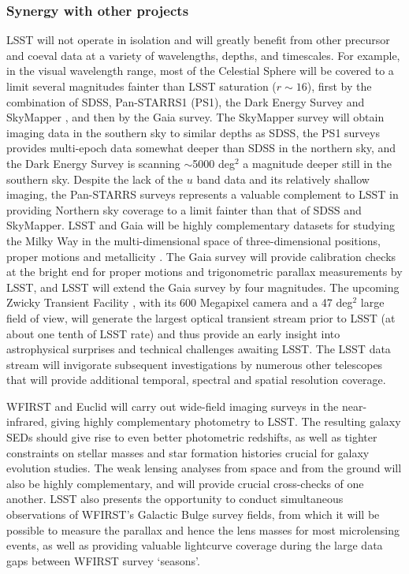 \subsubsection{  Synergy with other projects }

LSST will not operate in isolation and will greatly benefit from other precursor and coeval
data at a variety of wavelengths, depths, and timescales. For example,
in the visual wavelength range, most of the Celestial
Sphere will be covered to a limit several magnitudes fainter than LSST saturation
($r\sim16$), first by the combination of SDSS, Pan-STARRS1 (PS1), the
Dark Energy Survey \citep{2016MNRAS.460.1270D} and SkyMapper
\citep{2007PASA...24....1K},
and then by the Gaia survey. The SkyMapper survey will obtain imaging data in the southern
sky to similar depths as SDSS, the PS1 surveys provides multi-epoch
data somewhat deeper
than SDSS in the northern sky, and the Dark Energy Survey
 is scanning
$\sim$5000 deg$^2$ a magnitude deeper still in the southern sky. Despite the lack of
the $u$ band data and its relatively shallow imaging, the Pan-STARRS surveys
represents a valuable complement to LSST in providing Northern sky coverage to a limit
fainter than that of SDSS and SkyMapper. LSST and Gaia will
be highly complementary datasets for studying the Milky Way in the multi-dimensional space of
three-dimensional positions, proper motions and metallicity \citep{2012ARA&A..50..251I}.
The Gaia survey will provide calibration checks at the bright end for proper
motions and trigonometric parallax measurements by LSST, and LSST will extend the
Gaia survey by four magnitudes. The upcoming Zwicky Transient Facility \cite[e.g.,][]{2017arXiv170801584L},
with its 600 Megapixel camera and a 47 deg$^2$ large field of view, will generate the largest
optical transient stream prior to LSST (at about one tenth of LSST rate) and thus provide
an early insight into astrophysical surprises and technical challenges awaiting LSST.
The LSST data stream will invigorate subsequent investigations by numerous other telescopes
that will provide additional temporal, spectral and spatial resolution coverage.

WFIRST and Euclid will carry out wide-field imaging surveys in the
near-infrared, giving highly complementary photometry to LSST.  The
resulting galaxy SEDs should give rise to even better photometric
redshifts, as well as tighter constraints on stellar masses and star
formation histories crucial for galaxy evolution studies.  The weak
lensing analyses from space and from the ground will also be highly
complementary, and will provide crucial cross-checks of one another.
LSST also presents the opportunity to conduct simultaneous observations
of WFIRST's Galactic Bulge survey fields, from which it will be possible to
measure the parallax and hence the lens masses for most microlensing
events, as well as providing valuable lightcurve coverage during the large
data gaps between WFIRST survey `seasons'.

